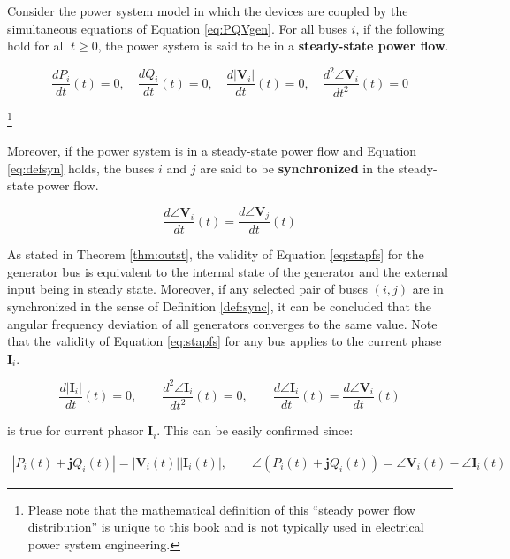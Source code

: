 \documentclass[graybox, envcountchap]{svmult}
\begin{document}
\begin{definition} \label{def:sync}

Consider the power system model in which the devices are coupled by the
simultaneous equations of Equation \ref{eq:PQVgen}. For all buses $i$, if the
following hold for all $t\geq0$, the power system is said to be in a
\textbf{steady-state power flow}.

\begin{equation}\label{eq:stapfs}
  \frac{dP_i}{dt}(t)=0
  ,\quad
  \frac{dQ_i}{dt}(t)=0
  ,\quad
  \frac{d|\bm{V}_i|}{dt}(t)=0
  ,\quad
  \frac{d^2 \angle \bm{V}_i }{dt^2}(t)=0
\end{equation}

\footnote{
Please note that the mathematical definition of this “steady power flow distribution” is unique to this book and is not typically used in electrical power system engineering.
}

Moreover, if the power system is in a steady-state power flow and Equation
\ref{eq:defsyn} holds, the buses $i$ and $j$ are said to be
\textbf{synchronized} in the steady-state power flow.

\begin{equation}\label{eq:defsyn}
  \frac{d \angle \bm{V}_i}{dt}(t) =  \frac{d \angle \bm{V}_j}{dt}(t)
\end{equation}
\end{definition}
As stated in Theorem \ref{thm:outst}, the validity of Equation \ref{eq:stapfs}
for the generator bus is equivalent to the internal state of the generator and
the external input being in steady state. Moreover, if any selected
pair of buses $(i,j)$ are in synchronized in the sense of Definition
\ref{def:sync}, it can be concluded that the angular frequency deviation of all
generators converges to the same value. Note that the validity of Equation
\ref{eq:stapfs} for any bus applies to the current phase $\bm{I}_i$.

\begin{equation*}
  \frac{d|\bm{I}_i|}{dt}(t)=0
  ,\qquad
  \frac{d^2 \angle \bm{I}_i }{dt^2}(t)=0
  ,\qquad
  \frac{d \angle \bm{I}_i }{dt}(t) = \frac{d \angle \bm{V}_i }{dt} (t)
\end{equation*}

is true for current phasor $\bm{I}_i$.
This can be easily confirmed since:

\begin{align*}
|P_i(t) + \bm{j} Q_i(t)| = |\bm{V}_i(t)| |\bm{I}_i(t)|
,\qquad
\angle(P_i(t) + \bm{j} Q_i(t)) = \angle \bm{V}_i(t) - \angle \bm{I}_i(t)
\end{align*}
\end{document}
